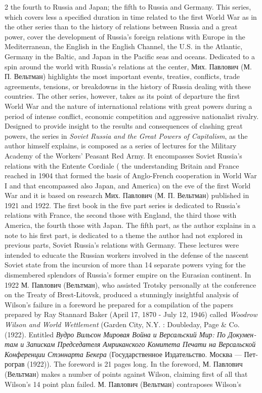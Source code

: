 \documentclass[10pt,a4paper,twoside]{article} %
\begin{document}
\begin{multicols}{2}
{the fourth to Russia and Japan; the fifth to Russia and Germany. This series, which covers less a specified duration in time related to the first World War as in the other series than to the history of relations between Russia and a great power, cover the development of Russia’s foreign relations with Europe in the Mediterranean, the English in the English Channel, the U.S. in the Atlantic, Germany in the Baltic, and Japan in the Pacific seas and oceans. Dedicated to a spin around the world with Russia’s relations at the center,  \textrussian{Мих. Павлович (М. П. Вельтман)} highlights the most important events, treaties, conflicts, trade agreements, tensions, or breakdowns in the history of Russia dealing with these countries.  \newline \indent The other series, however, takes as its point of departure the first World War and the nature of international relations with great powers during a period of intense conflict, economic competition and aggressive nationalist rivalry. Designed to provide insight to the results and consequences of clashing great powers, the series in \emph{Soviet Russia and the Great Powers of Capitalism}, as the author himself explains, is composed as a series of lectures for the Military Academy of the Workers’ Peasant Red Army. It encompasses Soviet Russia’s relations with the Entente Cordiale ( the understanding Britain and France reached in 1904 that formed the basis of Anglo-French cooperation in World War I and that encompassed also Japan, and America) on the eve of the first World War and it is based on research \textrussian{Мих. Павлович (М. П. Вельтман)} published in 1921 and 1922. The first book in the five part series is dedicated to Russia’s relations with France, the second those with England, the third those with America, the fourth those with Japan. The fifth part, as the author explains in a note to his first part, is dedicated to a theme the author had not explored in previous parts, Soviet Russia’s relations with Germany. These lectures were intended to educate the Russian workers involved in the defense of the nascent Soviet state from the incursion of more than 14 separate powers vying for the dismembered splendors of Russia’s former empire on the Eurasian continent. \newline \indent In 1922 \textrussian{М. Павлович (Вельтман)}, who assisted Trotsky personally at the conference on the Treaty of Brest-Litovsk, produced a stunningly insightful analysis of Wilson’s failure in a foreword he prepared for a compilation of the papers prepared by Ray Stannard Baker (April 17, 1870 - July 12, 1946) called \emph{Woodrow Wilson and World Wettlement} (Garden City, N.Y. : Doubleday, Page & Co. (1922). Entitled \textrussian{\emph{Вудро Вильсон Мировая Война и Версальский Мир: По Документам и Запискам Председателя Амриканского Комитета Печати на Версальской Конференции Стэннарта Бекера}} (\textrussian{Государственное Издательство. Москва — Петрограв} (1922)). The foreword is 21 pages long. In the foreword,  \textrussian{М. Павлович (Вельтман)} makes a number of points against Wilson, claiming first of all that Wilson’s 14 point plan failed. \textrussian{М. Павлович (Вельтман)} contraposes Wilson’s }
\end{multicols}
\end{document}
